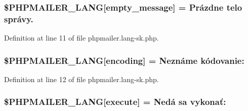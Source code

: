 \subsubsection[{\texorpdfstring{\$\+P\+H\+P\+M\+A\+I\+L\+E\+R\+\_\+\+L\+A\+NG}{$PHPMAILER_LANG}}]{\setlength{\rightskip}{0pt plus 5cm}\$P\+H\+P\+M\+A\+I\+L\+E\+R\+\_\+\+L\+A\+NG\mbox{[}\textquotesingle{}empty\+\_\+message\textquotesingle{}\mbox{]} = \textquotesingle{}Prázdne telo správy.\textquotesingle{}}\hypertarget{phpmailer_8lang-sk_8php_a33772099f637c9d6c2cd7425e0e37fed}{}\label{phpmailer_8lang-sk_8php_a33772099f637c9d6c2cd7425e0e37fed}


Definition at line 11 of file phpmailer.\+lang-\/sk.\+php.

\subsubsection[{\texorpdfstring{\$\+P\+H\+P\+M\+A\+I\+L\+E\+R\+\_\+\+L\+A\+NG}{$PHPMAILER_LANG}}]{\setlength{\rightskip}{0pt plus 5cm}\$P\+H\+P\+M\+A\+I\+L\+E\+R\+\_\+\+L\+A\+NG\mbox{[}\textquotesingle{}encoding\textquotesingle{}\mbox{]} = \textquotesingle{}Neznáme kódovanie\+: \textquotesingle{}}\hypertarget{phpmailer_8lang-sk_8php_a817f7283f3d54c970a0c10305cc668cc}{}\label{phpmailer_8lang-sk_8php_a817f7283f3d54c970a0c10305cc668cc}


Definition at line 12 of file phpmailer.\+lang-\/sk.\+php.

\subsubsection[{\texorpdfstring{\$\+P\+H\+P\+M\+A\+I\+L\+E\+R\+\_\+\+L\+A\+NG}{$PHPMAILER_LANG}}]{\setlength{\rightskip}{0pt plus 5cm}\$P\+H\+P\+M\+A\+I\+L\+E\+R\+\_\+\+L\+A\+NG\mbox{[}\textquotesingle{}execute\textquotesingle{}\mbox{]} = \textquotesingle{}Nedá sa vykonať\+: \textquotesingle{}}\hypertarget{phpmailer_8lang-sk_8php_a668217a9563a168f30f2a8548b6ed5a9}{}\label{phpmailer_8lang-sk_8php_a668217a9563a168f30f2a8548b6ed5a9}


